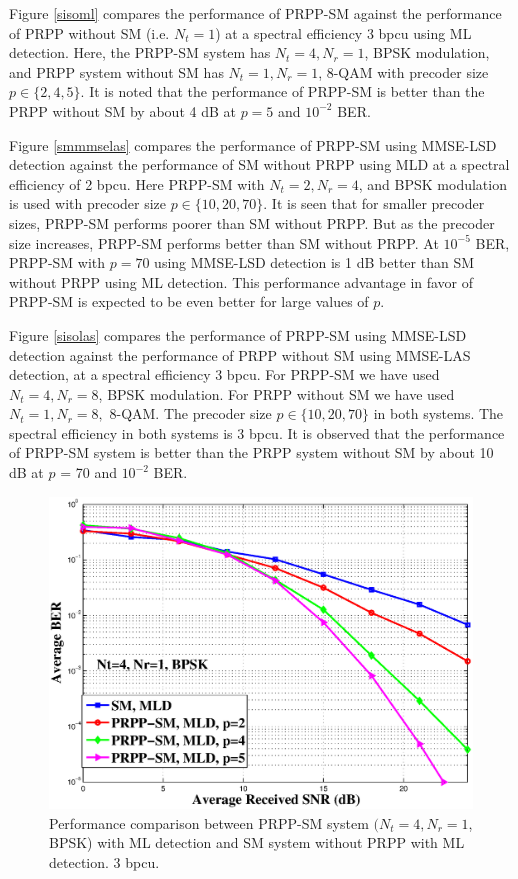 \documentclass[11pt, onecolumn]{report}
\begin{document}
Figure \ref{sisoml} compares the performance of PRPP-SM against the performance of PRPP without SM (i.e. $N_t=1$) at a spectral efficiency 3 bpcu using ML detection. Here, the PRPP-SM system has $N_t=4, N_r=1$, BPSK modulation, and PRPP system without SM  has $N_t=1, N_r=1$, 8-QAM  with precoder size  $ p \in\{2,4,5\}$. It is noted that the performance of PRPP-SM is better than the PRPP without SM by about 4 dB at $p=5$ and $10^{-2}$ BER. 

Figure \ref{smmmselas} compares the performance of PRPP-SM using MMSE-LSD detection against the performance of SM without PRPP using MLD at a spectral efficiency of 2 bpcu. Here PRPP-SM with $N_t=2, N_r=4$, and BPSK modulation is used with precoder size  $ p \in\{10,20,70\}$. It is seen that for smaller precoder sizes, PRPP-SM  performs poorer than SM without PRPP. But as the  precoder size increases, PRPP-SM performs better than SM without PRPP. At $10^{-5}$ BER, PRPP-SM with $p=70$ using MMSE-LSD detection is 1 dB  better than SM without PRPP using ML detection. This performance advantage in favor of PRPP-SM is expected to be even better for large values of $p$.

Figure \ref{sisolas} compares the performance of PRPP-SM using MMSE-LSD detection against the performance of PRPP without SM using MMSE-LAS detection, at a spectral efficiency 3 bpcu. For PRPP-SM we have used $N_t=4, N_r=8$, BPSK modulation. For PRPP without SM  we have used $N_t=1, N_r=8,$ 8-QAM.  The precoder size  $ p \in\{10,20,70\}$ in both systems. The spectral efficiency in both systems is 3 bpcu. It is observed that the performance of  PRPP-SM system is better than the PRPP system without SM by about 10 dB at $p$ = 70 and $10^{-2}$ BER. 






\begin{figure}[htb]
\centering

\includegraphics[totalheight=9cm,width=12cm]{prpp_sm_vs_withoutsm_ml.eps}
\caption{Performance comparison between PRPP-SM system $(N_t=4, N_r=1$, BPSK) with ML detection  and SM system without PRPP with ML detection. 3 bpcu.}
\label{smml}
\end{figure}
\end{document}
